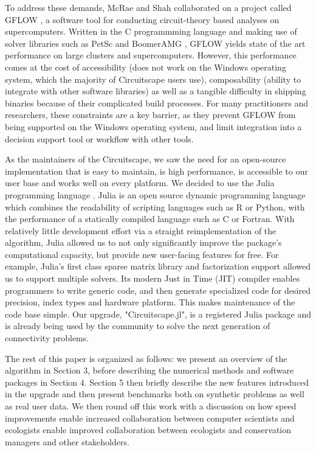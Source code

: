 \documentclass{juliacon}
\begin{document}
To address these demands, McRae and Shah collaborated on  a project called GFLOW \cite{leonard2017gflow}, a software tool for conducting circuit-theory based analyses on supercomputers. Written in the C programmming language and making use of solver libraries such as PetSc \cite{balay2004petsc} and BoomerAMG \cite{yang2002boomeramg}, GFLOW yields state of the art performance on large clusters and supercomputers. However, this performance comes at the cost of accessibility (does not work on the Windows operating system, which the majority of Circuitscape users use), composability (ability to integrate with other software libraries) as well as a tangible difficulty in shipping binaries because of their complicated build processes. For many practitioners and researchers, these constraints are a key barrier, as they prevent GFLOW from being supported on the Windows operating system, and limit integration into a decision support tool or workflow with other tools. 

As the maintainers of the Circuitscape, we saw the need for an open-source implementation that is easy to maintain, is high performance, is accessible to our user base and works well on every platform. We decided to use the Julia programming language \cite{bezanson2017julia}. Julia is an open source dynamic programming language which combines the readability of scripting languages such as R or Python, with the performance of a statically compiled language such as C or Fortran. With relatively little development effort via a straight reimplementation of the algorithm, Julia allowed us to not only significantly improve the package's computational capacity, but provide new user-facing features for free. For example, Julia's first class sparse matrix library and factorization support allowed us to support multiple solvers. Its modern Just in Time (JIT) compiler enables programmers to write generic code, and then generate specialized code for desired precision, index types and hardware platform. This makes maintenance of the code base simple. Our upgrade, "Circuitscape.jl", is a registered Julia package and is already being used by the community to solve the next generation of connectivity problems.  

The rest of this paper is organized as follows: we present an overview of the algorithm in Section 3, before describing the numerical methods and software packages in Section 4. Section 5 then briefly describe the new features introduced in the upgrade and then present benchmarks both on synthetic problems as well as real user data. We then round off this work with a discussion on how speed improvements enable increased collaboration between computer scientists and ecologists enable improved collaboration between ecologists and conservation managers and other stakeholders. 
\end{document}
